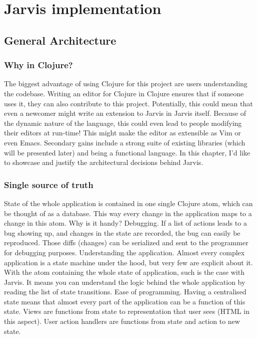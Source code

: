 \documentclass[11pt]{scrartcl}
\begin{document}
\section{Jarvis implementation}
\subsection{General Architecture}
\subsubsection{Why in Clojure?}
The biggest advantage of using Clojure for this project are users understanding the codebase. Writing an editor for Clojure in Clojure ensures that if someone uses it, they can also contribute to this project. Potentially, this could mean that even a newcomer might write an extension to Jarvis in Jarvis itself. Because of the dynamic nature of the language, this could even lead to people modifying their editors at run-time! This might make the editor as extensible as Vim or even Emacs.
Secondary gains include a strong suite of existing libraries (which will be presented later) and being a functional language. In this chapter, I’d like to showcase and justify the architectural decisions behind Jarvis.
\subsubsection{Single source of truth}
State of the whole application is contained in one single Clojure atom, which can be thought of as a database. This way every change in the application maps to a change in this atom. Why is it handy?
Debugging. If a list of actions leads to a bug showing up, and changes in the state are recorded, the bug can easily be reproduced. Those diffs (changes) can be serialized and sent to the programmer for debugging purposes. 
Understanding the application. Almost every complex application is a state machine under the hood, but very few are explicit about it. With the atom containing the whole state of application, such is the case with Jarvis. It means you can understand the logic behind the whole application by reading the list of state transitions.
Ease of programming. Having a centralised state means that almost every part of the application can be a function of this state. Views are functions from state to representation that user sees (HTML in this aspect). User action handlers are functions from state and action to new state.
\end{document}
